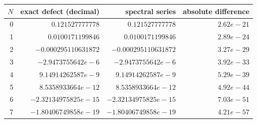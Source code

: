 \begin{tabular}{@{}rrrr@{}}
\toprule
$N$ & exact defect (decimal) & spectral series & absolute difference\\
\midrule
0 & $0.121527777778$ & $0.121527777778$ & $2.62e-21$\\
1 & $0.0100171199846$ & $0.0100171199846$ & $2.89e-24$\\
2 & $-0.000295110631872$ & $-0.000295110631872$ & $3.27e-29$\\
3 & $-2.9473755642e-6$ & $-2.9473755642e-6$ & $3.92e-33$\\
4 & $9.14914262587e-9$ & $9.14914262587e-9$ & $5.29e-39$\\
5 & $8.5358933664e-12$ & $8.5358933664e-12$ & $4.92e-44$\\
6 & $-2.32134975825e-15$ & $-2.32134975825e-15$ & $7.03e-51$\\
7 & $-1.80406749858e-19$ & $-1.80406749858e-19$ & $4.21e-57$\\
\bottomrule
\end{tabular}
